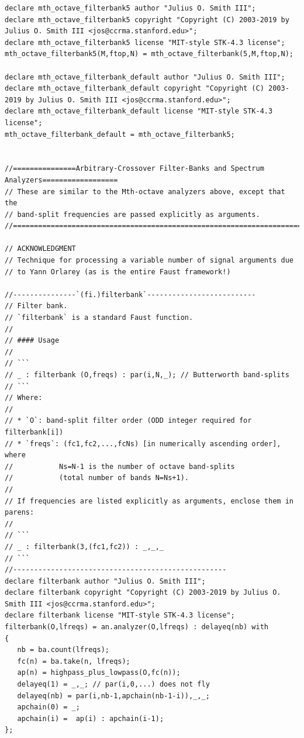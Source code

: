 \documentclass{article}
\begin{document}
\begin{lstlisting}[caption=\texttt{filters.lib}]
declare mth_octave_filterbank5 author "Julius O. Smith III";
declare mth_octave_filterbank5 copyright "Copyright (C) 2003-2019 by Julius O. Smith III <jos@ccrma.stanford.edu>";
declare mth_octave_filterbank5 license "MIT-style STK-4.3 license";
mth_octave_filterbank5(M,ftop,N) = mth_octave_filterbank(5,M,ftop,N);

declare mth_octave_filterbank_default author "Julius O. Smith III";
declare mth_octave_filterbank_default copyright "Copyright (C) 2003-2019 by Julius O. Smith III <jos@ccrma.stanford.edu>";
declare mth_octave_filterbank_default license "MIT-style STK-4.3 license";
mth_octave_filterbank_default = mth_octave_filterbank5;


//===============Arbitrary-Crossover Filter-Banks and Spectrum Analyzers==================
// These are similar to the Mth-octave analyzers above, except that the
// band-split frequencies are passed explicitly as arguments.
//========================================================================================

// ACKNOWLEDGMENT
// Technique for processing a variable number of signal arguments due
// to Yann Orlarey (as is the entire Faust framework!)

//---------------`(fi.)filterbank`--------------------------
// Filter bank.
// `filterbank` is a standard Faust function.
//
// #### Usage
//
// ```
// _ : filterbank (O,freqs) : par(i,N,_); // Butterworth band-splits
// ```
// Where:
//
// * `O`: band-split filter order (ODD integer required for filterbank[i])
// * `freqs`: (fc1,fc2,...,fcNs) [in numerically ascending order], where
//           Ns=N-1 is the number of octave band-splits
//           (total number of bands N=Ns+1).
//
// If frequencies are listed explicitly as arguments, enclose them in parens:
//
// ```
// _ : filterbank(3,(fc1,fc2)) : _,_,_
// ```
//---------------------------------------------------
declare filterbank author "Julius O. Smith III";
declare filterbank copyright "Copyright (C) 2003-2019 by Julius O. Smith III <jos@ccrma.stanford.edu>";
declare filterbank license "MIT-style STK-4.3 license";
filterbank(O,lfreqs) = an.analyzer(O,lfreqs) : delayeq(nb) with
{
   nb = ba.count(lfreqs);
   fc(n) = ba.take(n, lfreqs);
   ap(n) = highpass_plus_lowpass(O,fc(n));
   delayeq(1) = _,_; // par(i,0,...) does not fly
   delayeq(nb) = par(i,nb-1,apchain(nb-1-i)),_,_;
   apchain(0) = _;
   apchain(i) =  ap(i) : apchain(i-1);
};


\end{lstlisting}
\end{document}
